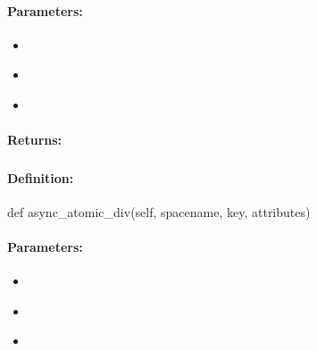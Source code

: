 \paragraph{Parameters:}
\begin{itemize}[noitemsep]
\item {}\\

\item {}\\

\item {}\\

\end{itemize}

\paragraph{Returns:}


\pagebreak
\subsubsection{}
\label{api:python:async_atomic_div}


\paragraph{Definition:}
\begin{pythoncode}
def async_atomic_div(self, spacename, key, attributes)
\end{pythoncode}

\paragraph{Parameters:}
\begin{itemize}[noitemsep]
\item {}\\

\item {}\\

\item {}\\

\end{itemize}

